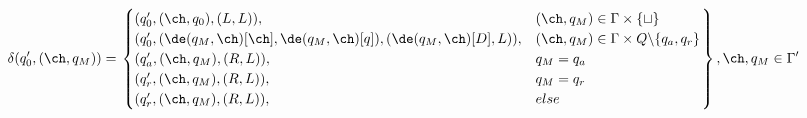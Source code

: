 \[
    \delta(q_0', (\ch, q_M)) = \left.
    \begin{cases}
        (q_0', (\ch, q_0), (L, L)) ,                                            & (\ch, q_M) \in \Gamma \times \{\sqcup\}                \\
        (q_0', (\de(q_M, \ch)[\ch], \de(q_M, \ch)[q]), (\de(q_M, \ch)[D], L)) , & (\ch, q_M) \in \Gamma \times Q \backslash \{q_a, q_r\} \\
        (q_a', (\ch, q_M), (R, L)),                                             & q_M = q_a                                              \\
        (q_r', (\ch, q_M), (R, L)),                                             & q_M = q_r                                              \\
        (q_r', (\ch, q_M), (R, L)),                                             & else                                                   \\
    \end{cases}
    \right\} , \ch, q_M \in \Gamma' \\
\]